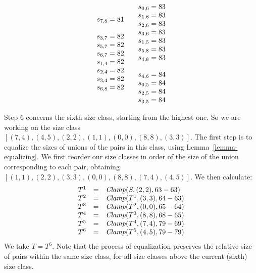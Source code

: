 \documentclass[letterpaper]{article} %
\theoremstyle{definition}
\newcommand{\Clamp}{\protect{\mbox{\textit{Clamp}}}}
\begin{document}
\[\begin{array}[t]{lllll}
\begin{array}{l}
s_{7, 8} = 81 \\
\\
s_{3, 7} = 82 \\
s_{5, 7} = 82 \\
s_{6, 7} = 82 \\
s_{1, 4} = 82 \\
s_{2, 4} = 82 \\
s_{3, 4} = 82 \\
s_{6, 8} = 82 \\
   \end{array}
 &
  \begin{array}{l}
s_{0, 6} = 83 \\
s_{1, 6} = 83 \\
s_{2, 6} = 83 \\
s_{3, 6} = 83 \\
s_{1, 5} = 83 \\
s_{5, 8} = 83 \\
s_{4, 8} = 83 \\
\\
s_{4, 6} = 84 \\
s_{0, 5} = 84 \\
s_{2, 5} = 84 \\
s_{3, 5} = 84 \\
\end{array}
\end{array}
\]

Step $6$ concerns the sixth size class, starting from the highest one.
So  we are working on the size class $[(7,4),(4,5),(2, 2),(1,1),(0,0),(8,8), (3,3)]$.  The first step is to equalize the sizes of unions of the pairs in this class, using Lemma~\ref{lemma-equalizing}.  We first reorder our size classes in order of the size of the union corresponding to each pair, obtaining $[(1,1), (2, 2), (3,3),  (0,0),(8,8), (7,4),(4,5)]$.  We then calculate:
\[ \begin{array}{lcl}
 T^1  & = &  \Clamp(S,(2,2), 63-63)\\

T^2 & = & \Clamp(T^1,(3,3),  64-63)\\

T^{3} & = & \Clamp(T^{2}, (0,0), 65-64 )\\
T^{4} & = & \Clamp(T^{3}, (8,8), 68-65 )\\
T^{5} & = & \Clamp(T^4, (7,4),79-69 )\\
T^{6} & = & \Clamp(T^{5}, (4,5), 79-79)\\
\end{array}
\]
We take $T = T^6$.  Note that the process of equalization preserves the relative size of pairs within the same size class, for all size classes above the current (sixth) size class.
\end{document}
